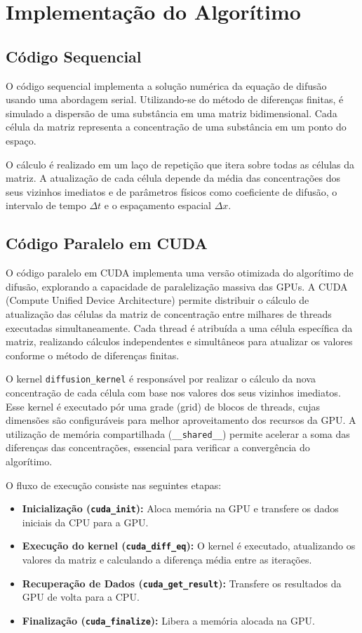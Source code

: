 \documentclass[12pt]{article}
\begin{document}
\section{Implementação do Algorítimo}

\subsection{Código Sequencial}

O código sequencial implementa a solução numérica da equação de difusão usando
uma abordagem serial. Utilizando-se do método de diferenças finitas, é simulado
a dispersão de uma substância em uma matriz bidimensional. Cada célula da
matriz representa a concentração de uma substância em um ponto do espaço.

O cálculo é realizado em um laço de repetição que itera sobre todas as células
da matriz. A atualização de cada célula depende da média das concentrações dos
seus vizinhos imediatos e de parâmetros físicos como coeficiente de difusão, o
intervalo de tempo $\Delta t$ e o espaçamento espacial $\Delta x$.

\subsection{Código Paralelo em CUDA}

O código paralelo em CUDA implementa uma versão otimizada do algorítimo de
difusão, explorando a capacidade de paralelização massiva das GPUs. A CUDA
(Compute Unified Device Architecture) permite distribuir o cálculo de
atualização das células da matriz de concentração entre milhares de threads
executadas simultaneamente. Cada thread é atribuída a uma célula específica da
matriz, realizando cálculos independentes e simultâneos para atualizar os
valores conforme o método de diferenças finitas.

O kernel \texttt{diffusion\_kernel} é responsável por realizar o cálculo da
nova concentração de cada célula com base nos valores dos seus vizinhos
imediatos. Esse kernel é executado pór uma grade (grid) de blocos de threads,
cujas dimensões são configuráveis para melhor aproveitamento dos recursos da
GPU. A utilização de memória compartilhada (\texttt{\_\_shared\_\_}) permite
acelerar a soma das diferenças das concentrações, essencial para verificar a
convergência do algorítimo.

O fluxo de execução consiste nas seguintes etapas:

\begin{itemize}
  \item \textbf{Inicialização (\texttt{cuda\_init}):} Aloca memória na GPU e transfere os dados iniciais da CPU para a GPU.
  \item \textbf{Execução do kernel (\texttt{cuda\_diff\_eq}):} O kernel é executado, atualizando os valores da matriz e calculando a diferença média entre as iterações.
  \item \textbf{Recuperação de Dados (\texttt{cuda\_get\_result}):} Transfere os resultados da GPU de volta para a CPU.
  \item \textbf{Finalização (\texttt{cuda\_finalize}):} Libera a memória alocada na GPU.
\end{itemize}
\end{document}

